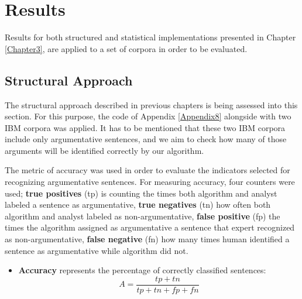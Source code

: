 \chapter{Results}

\label{Chapter5}

Results for both structured and statistical implementations presented in Chapter \ref{Chapter3}, are applied to a set of corpora in order to be evaluated. \par


\section{Structural Approach}

The structural approach described in previous chapters is being assessed into this section. For this purpose, the code of Appendix \ref{Appendix8} alongside with two IBM corpora was applied. It has to be mentioned that these two IBM corpora include only argumentative sentences, and we aim to check how many of those arguments will be identified correctly by our algorithm. 

The metric of accuracy was used in order to evaluate the indicators selected for recognizing argumentative sentences. For measuring accuracy, four counters were used; \textbf{true positives} (tp) is counting the times both algorithm and analyst labeled a sentence as argumentative, \textbf{true negatives} (tn) how often both algorithm and analyst labeled as non-argumentative, \textbf{false positive} (fp) the times the algorithm assigned as argumentative a sentence that expert recognized as non-argumentative, \textbf{false negative} (fn) how many times human identified a sentence as argumentative while algorithm did not. 

\begin{itemize}
 	\item \textbf{Accuracy} represents the percentage of correctly classified sentences:
 	\[ A
 	= \dfrac{tp + tn}{tp + tn + fp + fn}
 	\]	
\end{itemize} 

\begin{table}[H]
	\centering
	\caption{Results of Structural Approach} 
	\label{structural_approach_results}
\end{table}


